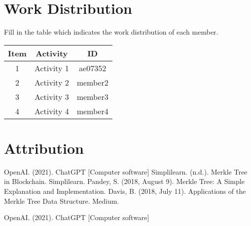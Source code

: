 \documentclass{article}
\begin{document}
\section{Work Distribution}
Fill in the table which indicates the work distribution of each member.
\begin{center}
  \begin{table}[h]
    \centering
    \begin{tabular}{|c|c|c|}
      \hline
      Item & Activity   & ID      \\ \hline
      1    & Activity 1 & ae07352 \\ \hline
      2    & Activity 2 & member2 \\ \hline
      3    & Activity 3 & member3 \\ \hline
      4    & Activity 4 & member4 \\ \hline
    \end{tabular}

    \label{tab:my-table6}
  \end{table}
\end{center}
\section{Attribution}
OpenAI. (2021). ChatGPT [Computer software] 
Simplilearn. (n.d.). Merkle Tree in Blockchain. Simplilearn. 
Pandey, S. (2018, August 9). Merkle Tree: A Simple Explanation and Implementation. 
Davis, B. (2018, July 11). Applications of the Merkle Tree Data Structure. Medium. 
\begin{thebibliography}{9}
  OpenAI. (2021). ChatGPT [Computer software]
  \end{thebibliography}
\end{document}
